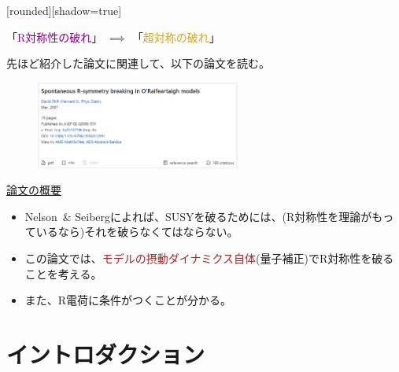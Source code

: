 \documentclass[
  unicode,a4paper,9pt,
  xcolor = {dvipsnames,svgnames},
  hyperref ={colorlinks=true,citecolor=Navy,linkcolor=NavyBlue,urlcolor=purple},
  ja=standard,lualatex
]{beamer}
\begin{document}
\begin{frame}
  [rounded][shadow=true]
  \begin{block}{}
    \centering
    「\textcolor{DarkMagenta}{R対称性の破れ}」
    $\implies$
    「\textcolor{Goldenrod}{超対称の破れ}」
  \end{block}

  先ほど紹介した論文に関連して、以下の論文を読む\cite{Shih:2007av}。

  \begin{figure}
    \centering
    \includegraphics[width=0.6\textwidth]{fig/Shih2007av.PNG}
  \end{figure}

  \uline{論文の概要}

  \begin{itemize}
    \item
          Nelson\ \& Seibergによれば、SUSYを破るためには、(R対称性を理論がもっているなら)それを破らなくてはならない。
    \item
          この論文では、\textcolor{FireBrick}{モデルの摂動ダイナミクス自体}(量子補正)でR対称性を破ることを考える。
    \item
          また、R電荷に条件がつくことが分かる。
  \end{itemize}

\end{frame}


\section{イントロダクション}

\begin{frame}[plain]
  \huge \secname
\end{frame}
\end{document}
